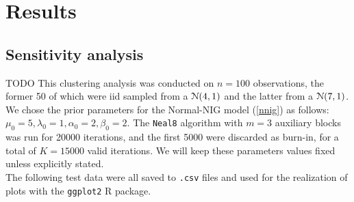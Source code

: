
\chapter{Results}
\section{Sensitivity analysis}
TODO
This clustering analysis was conducted on $n=100$ observations, the former 50 of which were iid sampled from a $\mathcal N(4,1)$ and the latter from a $\mathcal N(7,1)$.
We chose the prior parameters for the Normal-NIG model (\ref{nnig}) as follows: $\mu_0 = 5, \lambda_0 = 1, \alpha_0 = 2, \beta_0 = 2$.
The \verb|Neal8| algorithm with $m=3$ auxiliary blocks was run for 20000 iterations, and the first 5000 were discarded as burn-in, for a total of $K=15000$ valid iterations.
We will keep these parameters values fixed unless explicitly stated. \\
The following test data were all saved to \verb|.csv| files and used for the realization of plots with the \verb|ggplot2| R package.

